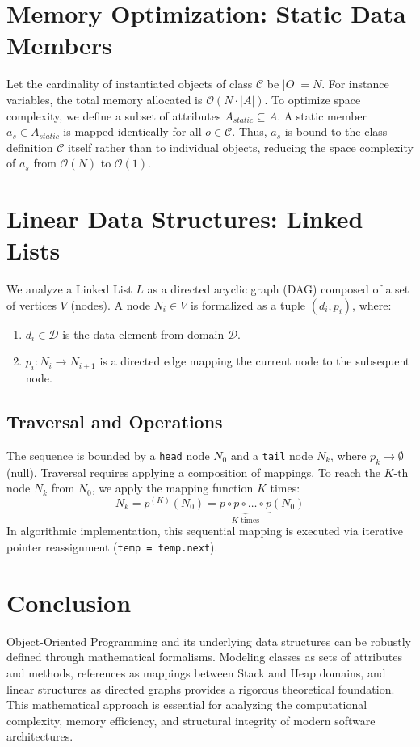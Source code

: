 \documentclass[10pt,journal,compsoc]{IEEEtran}
\begin{document}
\section{Memory Optimization: Static Data Members}
Let the cardinality of instantiated objects of class $\mathcal{C}$ be $|O| = N$. For instance variables, the total memory allocated is $\mathcal{O}(N \cdot |A|)$.
To optimize space complexity, we define a subset of attributes $A_{static} \subseteq A$. A static member $a_s \in A_{static}$ is mapped identically for all $o \in \mathcal{C}$. Thus, $a_s$ is bound to the class definition $\mathcal{C}$ itself rather than to individual objects, reducing the space complexity of $a_s$ from $\mathcal{O}(N)$ to $\mathcal{O}(1)$.

\section{Linear Data Structures: Linked Lists}
We analyze a Linked List $L$ as a directed acyclic graph (DAG) composed of a set of vertices $V$ (nodes).
A node $N_i \in V$ is formalized as a tuple $(d_i, p_i)$, where:
\begin{enumerate}
\item $d_i \in \mathcal{D}$ is the data element from domain $\mathcal{D}$.
\item $p_i : N_i \to N_{i+1}$ is a directed edge mapping the current node to the subsequent node.
\end{enumerate}

\subsection{Traversal and Operations}
The sequence is bounded by a \texttt{head} node $N_0$ and a \texttt{tail} node $N_k$, where $p_k \to \emptyset$ (null).
Traversal requires applying a composition of mappings. To reach the $K$-th node $N_k$ from $N_0$, we apply the mapping function $K$ times:
\[ N_k = p^{(K)}(N_0) = \underbrace{p \circ p \circ \dots \circ p}_{K \text{ times}}(N_0) \]
In algorithmic implementation, this sequential mapping is executed via iterative pointer reassignment (\texttt{temp = temp.next}).

\section{Conclusion}
Object-Oriented Programming and its underlying data structures can be robustly defined through mathematical formalisms. Modeling classes as sets of attributes and methods, references as mappings between Stack and Heap domains, and linear structures as directed graphs provides a rigorous theoretical foundation. This mathematical approach is essential for analyzing the computational complexity, memory efficiency, and structural integrity of modern software architectures.
\end{document}
